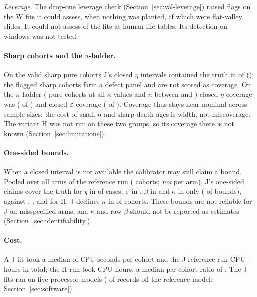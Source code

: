 \emph{Leverage.} The drop-one leverage check (Section~\ref{sec:val-leverage}) raised
 flags on the  W fits it could assess, when nothing was planted, of which 
were flat-valley slides. It could not assess  of the  fits at human life tables. Its
detection on windows was not tested.

\paragraph{Sharp cohorts and the $n$-ladder.} On the  valid sharp pure cohorts J's closed $\eta$ intervals
contained the truth in  of  (); the
flagged sharp cohorts form a defect panel and are not scored as coverage. On the $n$-ladder ( pure
cohorts at all $\kappa$ values and $n$ between  and ) closed $\eta$ coverage was
 ( of ) and closed $\varepsilon$ coverage 
( of ). Coverage thus stays near nominal across sample sizes; the cost of
small $n$ and sharp death ages is width, not miscoverage.
The variant H was not run on these two groups, so its coverage there is not known
(Section~\ref{sec:limitations}).

\paragraph{One-sided bounds.} When a closed interval is not available the calibrator may still claim a bound.
Pooled over all arms of the reference run ( cohorts; \emph{not} per arm), J's one-sided claims cover the
truth for $\eta$ in  of cases, $\varepsilon$ in , $\beta$ in  and
$\kappa$ in only  ( of  bounds), against
, ,  and  for H. J declines $\kappa$ in
 of cohorts. These bounds are not reliable for J on misspecified arms, and $\kappa$ and
raw $\beta$ should not be reported as estimates (Section~\ref{sec:identifiability}).

\paragraph{Cost.} A J fit took a median of  CPU-seconds per cohort and the J reference run
 CPU-hours in total; the H run took  CPU-hours, a median per-cohort ratio of
. The J fits ran on five processor models ( of  records off the
reference model; Section~\ref{sec:software}).
